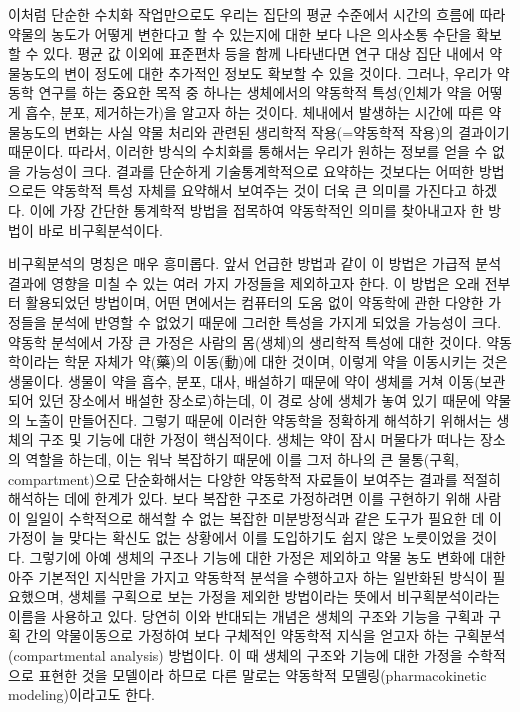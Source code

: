 \documentclass[
  11pt,
  krantz2, a4paper, twoside]{krantz}
\theoremstyle{definition}
\theoremstyle{definition}
\theoremstyle{definition}
\theoremstyle{definition}
\theoremstyle{remark}
\begin{document}
이처럼 단순한 수치화 작업만으로도 우리는 집단의 평균 수준에서 시간의 흐름에 따라 약물의 농도가 어떻게 변한다고 할 수 있는지에 대한 보다 나은 의사소통 수단을 확보할 수 있다.
평균 값 이외에 표준편차 등을 함께 나타낸다면 연구 대상 집단 내에서 약물농도의 변이 정도에 대한 추가적인 정보도 확보할 수 있을 것이다.
그러나, 우리가 약동학 연구를 하는 중요한 목적 중 하나는 생체에서의 약동학적 특성(인체가 약을 어떻게 흡수, 분포, 제거하는가)을 알고자 하는 것이다.
체내에서 발생하는 시간에 따른 약물농도의 변화는 사실 약물 처리와 관련된 생리학적 작용(=약동학적 작용)의 결과이기 때문이다.
따라서, 이러한 방식의 수치화를 통해서는 우리가 원하는 정보를 얻을 수 없을 가능성이 크다. 
결과를 단순하게 기술통계학적으로 요약하는 것보다는 어떠한 방법으로든 약동학적 특성 자체를 요약해서 보여주는 것이 더욱 큰 의미를 가진다고 하겠다. 
이에 가장 간단한 통계학적 방법을 접목하여 약동학적인 의미를 찾아내고자 한 방법이 바로 비구획분석이다.

비구획분석의 명칭은 매우 흥미롭다.
앞서 언급한 방법과 같이 이 방법은 가급적 분석결과에 영향을 미칠 수 있는 여러 가지 가정들을 제외하고자 한다.
이 방법은 오래 전부터 활용되었던 방법이며, 어떤 면에서는 컴퓨터의 도움 없이 약동학에 관한 다양한 가정들을 분석에 반영할 수 없었기 때문에 그러한 특성을 가지게 되었을 가능성이 크다.
약동학 분석에서 가장 큰 가정은 사람의 몸(생체)의 생리학적 특성에 대한 것이다. 
약동학이라는 학문 자체가 약(藥)의 이동(動)에 대한 것이며, 이렇게 약을 이동시키는 것은 생물이다. 
생물이 약을 흡수, 분포, 대사, 배설하기 때문에 약이 생체를 거쳐 이동(보관되어 있던 장소에서 배설한 장소로)하는데, 이 경로 상에 생체가 놓여 있기 때문에 약물의 노출이 만들어진다.
그렇기 때문에 이러한 약동학을 정확하게 해석하기 위해서는 생체의 구조 및 기능에 대한 가정이 핵심적이다. 
생체는 약이 잠시 머물다가 떠나는 장소의 역할을 하는데, 이는 워낙 복잡하기 때문에 이를 그저 하나의 큰 물통(구획, compartment)으로 단순화해서는 다양한 약동학적 자료들이 보여주는 결과를 적절히 해석하는 데에 한계가 있다. 
보다 복잡한 구조로 가정하려면 이를 구현하기 위해 사람이 일일이 수학적으로 해석할 수 없는 복잡한 미분방정식과 같은 도구가 필요한 데 이 가정이 늘 맞다는 확신도 없는 상황에서 이를 도입하기도 쉽지 않은 노릇이었을 것이다.
그렇기에 아예 생체의 구조나 기능에 대한 가정은 제외하고 약물 농도 변화에 대한 아주 기본적인 지식만을 가지고 약동학적 분석을 수행하고자 하는 일반화된 방식이 필요했으며, 생체를 구획으로 보는 가정을 제외한 방법이라는 뜻에서 비구획분석이라는 이름을 사용하고 있다. 
당연히 이와 반대되는 개념은 생체의 구조와 기능을 구획과 구획 간의 약물이동으로 가정하여 보다 구체적인 약동학적 지식을 얻고자 하는 구획분석(compartmental analysis) 방법이다.
이 때 생체의 구조와 기능에 대한 가정을 수학적으로 표현한 것을 모델이라 하므로 다른 말로는 약동학적 모델링(pharmacokinetic modeling)이라고도 한다.
\end{document}
